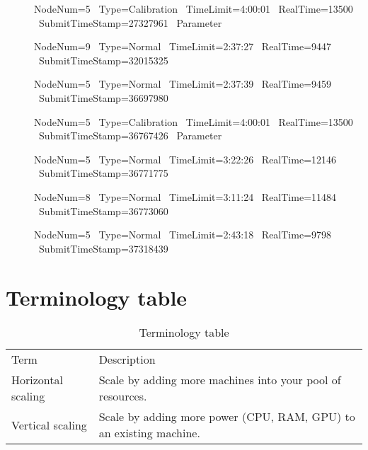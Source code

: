 \begin{description}
\item[] NodeNum=5 \ Type=Calibration \ TimeLimit=4:00:01 \ RealTime=13500 \ SubmitTimeStamp=27327961 \ Parameter
\item[] NodeNum=9 \ Type=Normal \ TimeLimit=2:37:27 \ RealTime=9447 \ SubmitTimeStamp=32015325
\item[] NodeNum=5 \ Type=Normal \ TimeLimit=2:37:39 \ RealTime=9459 \ SubmitTimeStamp=36697980
\item[] NodeNum=5 \ Type=Calibration \ TimeLimit=4:00:01 \ RealTime=13500 \ SubmitTimeStamp=36767426 \ Parameter
\item[] NodeNum=5 \ Type=Normal \ TimeLimit=3:22:26 \ RealTime=12146 \ SubmitTimeStamp=36771775
\item[] NodeNum=8 \ Type=Normal \ TimeLimit=3:11:24 \ RealTime=11484 \ SubmitTimeStamp=36773060
\item[] NodeNum=5 \ Type=Normal \ TimeLimit=2:43:18 \ RealTime=9798 \ SubmitTimeStamp=37318439
 
\end{description}

\section{Terminology table}
\begin{table}[]
    \centering
    \begin{tabular}{ll}
    Term               & Description                                                        \\
    Horizontal scaling\label{Hscaling} & Scale by adding more machines into your pool of resources.         \\
    Vertical scaling\label{Vscaling}   & Scale by adding more power (CPU, RAM, GPU) to an existing machine.
    \end{tabular}
    \caption{Terminology table}
    \label{tab:my-table}
\end{table}

